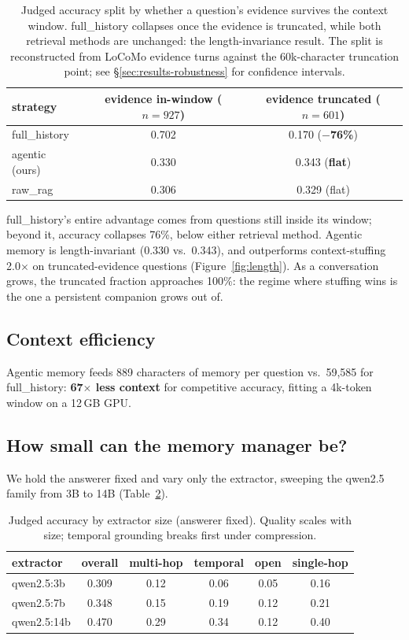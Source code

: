 \begin{table}[t]
\centering\small
\begin{tabular}{lcc}
\toprule
strategy & evidence in-window ($n{=}927$) & evidence truncated ($n{=}601$) \\
\midrule
full\_history & 0.702 & 0.170 (\textbf{$-$76\%}) \\
agentic (ours) & 0.330 & 0.343 (\textbf{flat}) \\
raw\_rag & 0.306 & 0.329 (flat) \\
\bottomrule
\end{tabular}
\caption{Judged accuracy split by whether a question's evidence survives the
context window. full\_history collapses once the evidence is truncated, while
both retrieval methods are unchanged: the length-invariance result. The split
is reconstructed from LoCoMo evidence turns against the 60k-character truncation
point; see \S\ref{sec:results-robustness} for confidence intervals.}
\label{tab:length}
\end{table}

full\_history's entire advantage comes from questions still inside its window;
beyond it, accuracy collapses 76\%, below either retrieval method. Agentic memory
is length-invariant (0.330 vs.\ 0.343), and outperforms context-stuffing
2.0$\times$ on truncated-evidence questions (Figure~\ref{fig:length}). As a
conversation grows, the truncated fraction approaches 100\%: the regime where
stuffing wins is the one a persistent companion grows out of.

\subsection{Context efficiency}
\label{sec:results-efficiency}
Agentic memory feeds 889 characters of memory per question vs.\ 59{,}585 for
full\_history: \textbf{67$\times$ less context} for competitive accuracy,
fitting a 4k-token window on a 12\,GB GPU.

\subsection{How small can the memory manager be?}
\label{sec:results-ladder}

We hold the answerer fixed and vary only the extractor, sweeping the qwen2.5
family from 3B to 14B (Table~\ref{tab:ladder}).

\begin{table}[t]
\centering\small
\begin{tabular}{lccccc}
\toprule
extractor & overall & multi-hop & temporal & open & single-hop \\
\midrule
qwen2.5:3b & 0.309 & 0.12 & 0.06 & 0.05 & 0.16 \\
qwen2.5:7b & 0.348 & 0.15 & 0.19 & 0.12 & 0.21 \\
qwen2.5:14b & 0.470 & 0.29 & 0.34 & 0.12 & 0.40 \\
\bottomrule
\end{tabular}
\caption{Judged accuracy by extractor size (answerer fixed). Quality scales with
size; temporal grounding breaks first under compression.}
\label{tab:ladder}
\end{table}

